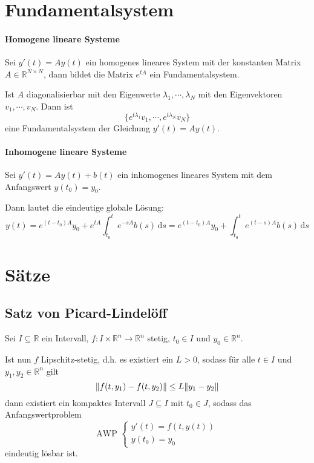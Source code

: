     \section{Fundamentalsystem}
        \paragraph{Homogene lineare Systeme}
            Sei $ y'(t) = Ay(t) $ ein homogenes lineares System mit der konstanten Matrix $ A \in \mathbb{R} ^ { N \times N } $, dann bildet die Matrix $ e ^ { tA } $ ein Fundamentalsystem.

            Ist $ A $ diagonalisierbar mit den Eigenwerte $ \lambda _ 1, \cdots, \lambda _ N $ mit den Eigenvektoren $ v _ 1, \cdots, v _ N $. Dann ist \[ \{ e ^ { t \lambda _ 1 } v _ 1, \cdots, e ^ { t \lambda _ N } v _ N \} \] eine Fundamentalsystem der Gleichung $ y'(t) = Ay(t) $.

        \paragraph{Inhomogene lineare Systeme}
            Sei $ y'(t) = Ay(t) + b(t) $ ein inhomogenes lineares System mit dem Anfangswert $ y(t _ 0) = y _ 0 $.

            Dann lautet die eindeutige globale Lösung:
            \begin{equation*}
                y(t) = e ^ { (t - t _ 0)A } y _ 0 + e ^ { tA } \int _ { t _ 0 } ^ t \! e ^ { -sA } b(s) \, \mathrm{d}s = e ^ { (t - t _ 0) A } y _ 0 + \int _ { t _ 0 } ^ t \! e ^ { (t - s) A } b(s) \, \mathrm{d}s
            \end{equation*}

    \section{Sätze}
        \subsection{Satz von Picard-Lindelöff}
            Sei $ I \subseteq \mathbb{R} $ ein Intervall, $ f : I \times \mathbb{R} ^ n \rightarrow \mathbb{R} ^ n $ stetig, $ t _ 0 \in I $ und $ y _ 0 \in \mathbb{R} ^ n $.

            Ist nun $ f $ Lipschitz-stetig, d.h. es existiert ein $ L > 0 $, sodass für alle $ t \in I $ und $ y _ 1, y _ 2 \in \mathbb{R} ^ n $ gilt \[ \norm{f(t, y _ 1) - f(t, y _ 2)} \leq L\norm{y _ 1 - y _ 2} \] dann existiert ein kompaktes Intervall $ J \subseteq I $ mit $ t _ 0 \in J $, sodass das Anfangswertproblem
            \begin{equation*}
                \text{AWP }
                \begin{cases}
                    y'(t) = f(t, y(t)) \\
                    y(t _ 0) = y _ 0
                \end{cases}
            \end{equation*}
            eindeutig lösbar ist.

